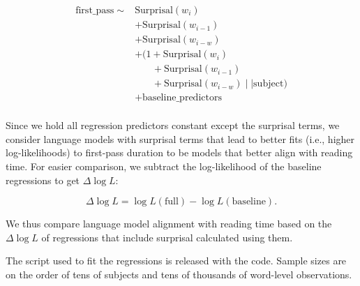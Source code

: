 \documentclass[11pt]{article}
\begin{document}
\begin{align}
\label{eq:full-model}
\mathrm{first\_pass} \sim{} &\mathrm{Surprisal}(w_i)\nonumber\\
&+ \mathrm{Surprisal}(w_{i-1})\nonumber\\&+ \mathrm{Surprisal}(w_{i-w}) \nonumber\\
&+ (1 +\mathrm{Surprisal}(w_i)\nonumber\\
&~~~~~~~~+ \mathrm{Surprisal}(w_{i-1})\nonumber\\&~~~~~~~~+\mathrm{Surprisal}(w_{i-w}) \mid\mid \mathrm{subject})\nonumber\\
&+ \mathrm{baseline\_predictors} \nonumber\\
\end{align}

Since we hold all regression predictors constant except the surprisal terms, we consider language models with surprisal terms that lead to better fits (i.e., higher log-likelihoods) to first-pass duration to be models that better align with reading time. For easier comparison, we subtract the log-likelihood of the baseline regressions to get $\Delta\log L$: 

\begin{equation}
\Delta\log L = \log L(\text{full}) - \log L(\text{baseline}).
\end{equation}

We thus compare language model alignment with reading time based on the $\Delta\log L$ of regressions that include surprisal calculated using them.


The script used to fit the regressions is released with the code. Sample
sizes are on the order of tens of subjects and tens of thousands of
word-level observations.


\end{document}
